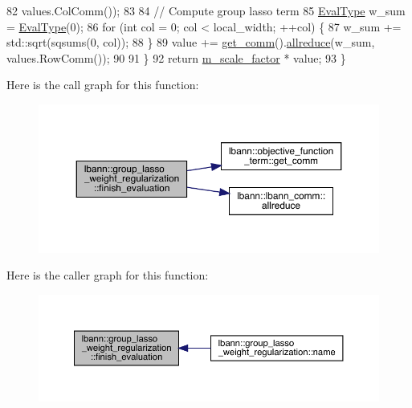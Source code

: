 \begin{DoxyCode}
82                           values.ColComm());
83 
84     \textcolor{comment}{// Compute group lasso term}
85     \hyperlink{base_8hpp_a3266f5ac18504bbadea983c109566867}{EvalType} w\_sum = \hyperlink{base_8hpp_a3266f5ac18504bbadea983c109566867}{EvalType}(0);
86     \textcolor{keywordflow}{for} (\textcolor{keywordtype}{int} col = 0; col < local\_width; ++col) \{
87       w\_sum += std::sqrt(sqsums(0, col));
88     \}
89     value += \hyperlink{classlbann_1_1objective__function__term_a5f89b676a26a6b76ddc26563ac87beb9}{get\_comm}().\hyperlink{classlbann_1_1lbann__comm_af5631e5f0f54e4df4958eba9df2599ef}{allreduce}(w\_sum, values.RowComm());
90 
91   \}
92   \textcolor{keywordflow}{return} \hyperlink{classlbann_1_1objective__function__term_a59a544b8ff0455ed5091de3bf0d81c3c}{m\_scale\_factor} * value;
93 \}
\end{DoxyCode}
Here is the call graph for this function\+:\nopagebreak
\begin{figure}[H]
\begin{center}
\leavevmode
\includegraphics[width=350pt]{classlbann_1_1group__lasso__weight__regularization_a48c46b2e06337e1890b12811182db11b_cgraph}
\end{center}
\end{figure}
Here is the caller graph for this function\+:\nopagebreak
\begin{figure}[H]
\begin{center}
\leavevmode
\includegraphics[width=350pt]{classlbann_1_1group__lasso__weight__regularization_a48c46b2e06337e1890b12811182db11b_icgraph}
\end{center}
\end{figure}
\mbox{\label{classlbann_1_1group__lasso__weight__regularization_a1cd895144b2816592ceeecd4d2f7a1d1}} 
